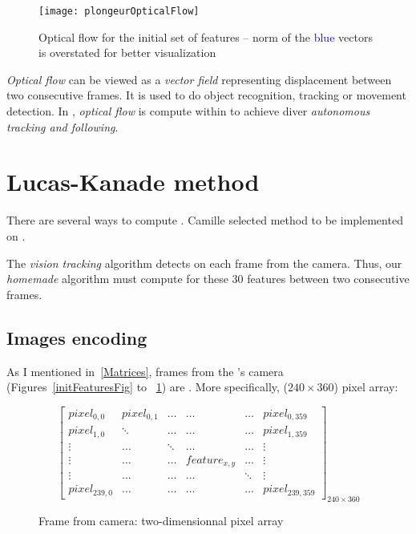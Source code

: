 \begin{figure}[!htbp]
	\centering
	\texttt{[image: plongeurOpticalFlow]}
	\caption{Optical flow for the initial set of features -- \small{norm of the \textcolor{blue}{blue} vectors is overstated for better visualization}}
	\label{opticalFlowFig}
\end{figure}
\FloatBarrier

\emph{Optical flow} can be viewed as a \emph{vector field} representing  displacement between two consecutive frames. It is used to do object recognition, tracking or movement detection. In \iBubble, \emph{optical flow} is compute within  to achieve diver \emph{autonomous tracking and following}.\par


\section{Lucas-Kanade method}

There are several ways to compute . Camille selected  method to be implemented on \vc.

The \emph{vision tracking} algorithm detects  on each frame from the camera. Thus, our \emph{homemade} algorithm must compute  for these 30 features between two consecutive frames.


\subsection{Images encoding}

As I mentioned in~\ref{Matrices}, frames from the \rasp's camera (Figures~\ref{initFeaturesFig} to ~\ref{opticalFlowFig}) are . More specifically, ($240\times 360$) pixel array:

\begin{figure}[!htbp]
\[
\begin{bmatrix}

pixel_{0,0} & pixel_{0,1} & \ldots & \ldots & \ldots & pixel_{0,359}\\

pixel_{1,0} & \ddots & \ldots & \ldots & \ldots & pixel_{1,359}\\

\vdots & \ldots & \ddots & \ldots & \ldots & \vdots\\

\vdots & \ldots & \ldots & feature_{x,y} & \ldots & \vdots\\

\vdots & \ldots & \ldots & \ldots & \ddots & \vdots\\

pixel_{239,0} & \ldots & \ldots  & \ldots & \ldots & pixel_{239,359}

\end{bmatrix}_{240\times 360}
\]
\caption{Frame from camera: two-dimensionnal pixel array}
\label{frameFig}
\end{figure}
\FloatBarrier

